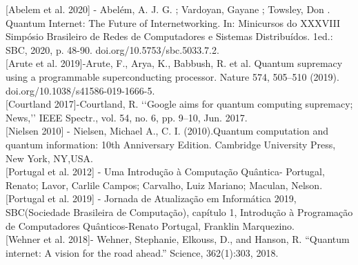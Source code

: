 \documentclass{article}
\begin{document}
    [Abelem et al. 2020] - Abelém, A. J. G. ; Vardoyan, Gayane ; Towsley, Don . Quantum Internet: The Future of Internetworking. In: Minicursos do XXXVIII Simpósio Brasileiro de Redes de Computadores e Sistemas Distribuídos. 1ed.: SBC, 2020, p. 48-90. doi.org/10.5753/sbc.5033.7.2.\\
    
    [Arute et al. 2019]-Arute, F., Arya, K., Babbush, R. et al. Quantum supremacy using a programmable superconducting processor. Nature 574, 505–510 (2019). doi.org/10.1038/s41586-019-1666-5.\\
    
    [Courtland 2017]-Courtland, R. ‘‘Google aims for quantum computing supremacy; News,’’ IEEE Spectr., vol. 54, no. 6, pp. 9–10, Jun. 2017.\\
    
    [Nielsen 2010] - Nielsen, Michael A., C. I. (2010).Quantum computation and quantum information:  10th Anniversary Edition.  Cambridge University Press, New York, NY,USA.\\
    
    [Portugal et al. 2012] - Uma Introdução à Computação Quântica- Portugal, Renato; Lavor, Carlile Campos; Carvalho, Luiz Mariano; Maculan, Nelson.\\
    
    [Portugal et al. 2019] - Jornada de Atualização em Informática 2019, SBC(Sociedade Brasileira de Computação), capítulo 1, Introdução à Programação de Computadores Quânticos-Renato Portugal, Franklin Marquezino.\\

    [Wehner et al. 2018]- Wehner, Stephanie, Elkouss, D., and Hanson, R. “Quantum internet: A vision for the road ahead.” Science, 362(1):303, 2018.\\


\newpage
\end{document}
